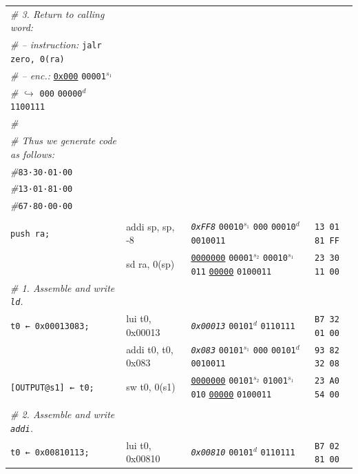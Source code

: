 \documentclass[a4paper,12pt,final]{article}
\begin{document}
\begin{table}[!htbp]
\begin{adjustwidth}{-1cm}{-1cm}
\begin{center}
\begin{tabular}{l|ll|l}
\emph{\# 3. Return to calling word:} &  &  & \\[0pt]
\emph{\# – instruction:} \texttt{jalr zero, 0(ra)} &  &  & \\[0pt]
\emph{\# – enc.:} \uline{\texttt{0x000}} \texttt{00001}​\(^{s_{1}}\) &  &  & \\[0pt]
\emph{\#}\hspace{3.5em} \(\hookrightarrow\) \texttt{000} \texttt{00000}​\(^{d}\)  \texttt{1100111} &  &  & \\[0pt]
\emph{\#} &  &  & \\[0pt]
\emph{\# Thus we generate code as follows:} &  &  & \\[0pt]
\emph{\#}\hspace{1.053000em}​\texttt{83·30·01·00} &  &  & \\[0pt]
\emph{\#}\hspace{1.053000em}​\texttt{13·01·81·00} &  &  & \\[0pt]
\emph{\#}\hspace{1.053000em}​\texttt{67·80·00·00} &  &  & \\[0pt]
 &  &  & \\[0pt]
\texttt{push ra;} & addi sp, sp, -8 & \emph{\texttt{0xFF8}}                    \texttt{00010}​\(^{s_{1}}\) \texttt{000} \texttt{00010}​\(^{d}\)  \texttt{0010011} & \texttt{13 01 81 FF}\\[0pt]
 & sd ra, 0(sp) & \uline{\texttt{0000000}} \texttt{00001}​\(^{s_{2}}\) \texttt{00010}​\(^{s_{1}}\) \texttt{011} \uline{\texttt{00000}} \texttt{0100011} & \texttt{23 30 11 00}\\[0pt]
\emph{\# 1. Assemble and write \texttt{ld}.} &  &  & \\[0pt]
\texttt{t0 ← 0x00013083;} & lui t0, 0x00013 & \emph{\texttt{0x00013}}                                                  \texttt{00101}​\(^{d}\)  \texttt{0110111} & \texttt{B7 32 01 00}\\[0pt]
 & addi t0, t0, 0x083 & \emph{\texttt{0x083}}                    \texttt{00101}​\(^{s_{1}}\) \texttt{000} \texttt{00101}​\(^{d}\)  \texttt{0010011} & \texttt{93 82 32 08}\\[0pt]
\texttt{[OUTPUT@s1] ← t0;} & sw t0, 0(s1) & \uline{\texttt{0000000}} \texttt{00101}​\(^{s_{2}}\) \texttt{01001}​\(^{s_{1}}\) \texttt{010} \uline{\texttt{00000}} \texttt{0100011} & \texttt{23 A0 54 00}\\[0pt]
 &  &  & \\[0pt]
\emph{\# 2. Assemble and write \texttt{addi}.} &  &  & \\[0pt]
\texttt{t0 ← 0x00810113;} & lui t0, 0x00810 & \emph{\texttt{0x00810}}                                                  \texttt{00101}​\(^{d}\)  \texttt{0110111} & \texttt{B7 02 81 00}\\[0pt]

\end{tabular}
\end{center}
\end{adjustwidth}
\end{table}
\end{document}
